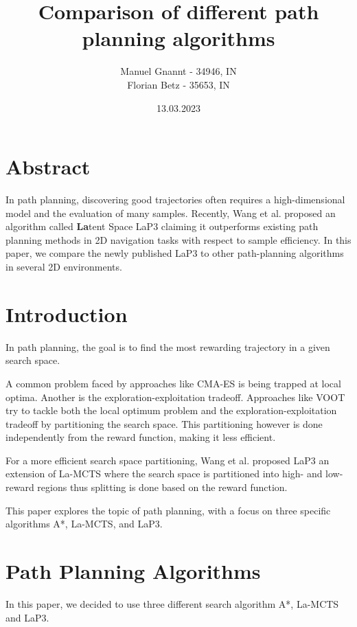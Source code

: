 \documentclass[bibliography=totoc]{scrartcl}
\title{Comparison of different path planning algorithms}
\author{Manuel Gnannt - 34946, IN \\ Florian Betz - 35653, IN}
\date{13.03.2023}%
\begin{document}
\maketitle
\tableofcontents

\clearpage
\section{Abstract}
In path planning, discovering good trajectories often requires a high-dimensional model and the evaluation of many samples. Recently, Wang et al. proposed an algorithm called \textbf{La}tent Space \ac{LaP3} claiming it outperforms existing path planning methods in 2D navigation tasks with respect to sample efficiency. In this paper, we compare the newly published \ac{LaP3} to other path-planning algorithms in several 2D environments.

\section{Introduction}
In path planning, the goal is to find the most rewarding trajectory in a given search space. 

A common problem faced by approaches like \ac{CMA-ES} \cite{CMA-ES} is being trapped at local optima. 
Another is the exploration-exploitation tradeoff. 
Approaches like \ac{VOOT} \cite{VOOT} try to tackle both the local optimum problem and the exploration-exploitation tradeoff by partitioning the search space.
This partitioning however is done independently from the reward function, making it less efficient.

For a more efficient search space partitioning, Wang et al. proposed \ac{LaP3} an extension of \ac{La-MCTS} \cite{La-MCTS} where the search space is  partitioned into high- and low-reward regions thus splitting is done based on the reward function.

This paper explores the topic of path planning, with a focus on three specific algorithms A*, \ac{La-MCTS}, and \ac{LaP3}. 

\section{Path Planning Algorithms}
\label{path_planning_algorithm}
In this paper, we decided to use three different search algorithm A*, \ac{La-MCTS} and \ac{LaP3}.
\end{document}
